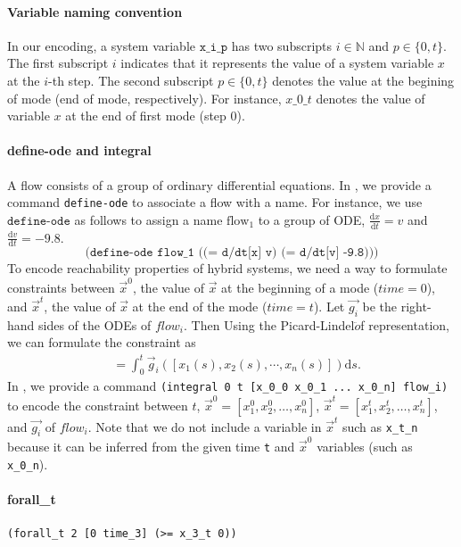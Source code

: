 \paragraph{Variable naming convention}
In our encoding, a system variable $\texttt{x\_i\_p}$ has two
subscripts $i \in \mathbb{N}$ and $p \in \{0, t\}$. The first
subscript $i$ indicates that it represents the value of a system
variable $x$ at the $i$-th step. The second subscript $p \in \{0, t\}$
denotes the value at the begining of mode (end of mode,
respectively). For instance, $x\_0\_t$ denotes the value of variable
$x$ at the end of first mode (step 0).

\paragraph{define-ode and integral}
A flow consists of a group of ordinary differential equations. In
\drh{}, we provide a command \texttt{define-ode} to associate a flow
with a name. For instance, we use $\texttt{define-ode}$ as follows to
assign a name $\mathrm{flow_1}$ to a group of ODE,
$\frac{\mathrm{d}x}{\mathrm{d}t} = v$ and
$\frac{\mathrm{d}v}{\mathrm{d}t} = -9.8$.
\[
\texttt{(define-ode flow\_1 ((= d/dt[x] v) (= d/dt[v] -9.8)))}
\]
To encode reachability properties of hybrid systems, we need a way to
formulate constraints between $\vec{x}^0$, the value of $\vec{x}$ at
the beginning of a mode ($time = 0$), and $\vec{x}^t$, the value of
$\vec{x}$ at the end of the mode ($time = t$). Let $\vec{g_i}$ be the
right-hand sides of the ODEs of $flow_i$. Then Using the
Picard-Lindel$\ddot{o}$f representation, we can formulate the
constraint as
\begin{align*}
[x_1^t, x_2^t, \dots, x_n^t] &= \int_0^t \vec{g}_i([x_1(s), x_2(s), \cdots,
x_n(s)]) \mathrm{d}s.
\end{align*}
In \drh{}, we provide a command \texttt{(integral 0 t [x\_0\_0 x\_0\_1
  ... x\_0\_n] flow\_i)} to encode the
constraint between $t$, $\vec{x}^0 = [x_1^0, x_2^0, \dots, x_n^0]$,
$\vec{x}^t = [x_1^t, x_2^t, \dots, x_n^t]$, and $\vec{g_i}$ of
$flow_i$. Note that we do not include a variable in $\vec{x}^t$ such
as \texttt{x\_t\_n} because it can be inferred from the given time
\texttt{t} and $\vec{x}^0$ variables (such as \texttt{x\_0\_n}).

\paragraph{forall\_t}
\begin{Verbatim}[fontfamily=courier]
(forall_t 2 [0 time_3] (>= x_3_t 0))
\end{Verbatim}

